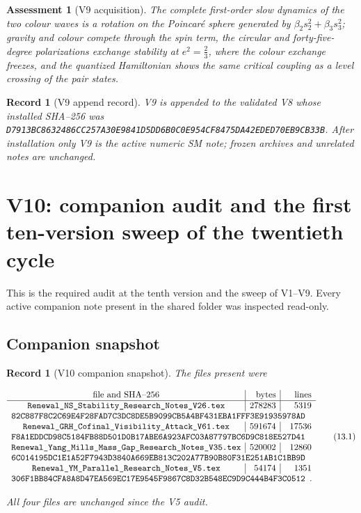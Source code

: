 \documentclass[11pt]{article}
\newtheorem{assessment}[theorem]{Assessment}
\newtheorem{record}[theorem]{Record}
\theoremstyle{remark}
\begin{document}
\begin{assessment}[V9 acquisition]
\label{ass:v20v9}
The complete first-order slow dynamics of the two colour waves is a
rotation on the Poincar\'e sphere generated by
\(\beta_2s_2^2+\beta_3s_3^2\); gravity and colour compete through the
spin term, the circular and forty-five-degree polarizations exchange
stability at \(e^2=\tfrac23\), where the colour exchange freezes, and
the quantized Hamiltonian shows the same critical coupling as a level
crossing of the pair states.
\end{assessment}

\begin{record}[V9 append record]
\label{rec:v20v9}
V9 is appended to the validated V8 whose installed SHA--256 was
\texttt{D7913BC8632486CC257A30E9841D5DD6B0C0E954CF8475DA42EDED70EB9CB33B}.
After installation only V9 is the active numeric SM note; frozen
archives and unrelated notes are unchanged.
\end{record}


\section{V10: companion audit and the first ten-version sweep of the twentieth cycle}
\label{sec:v20v10}

This is the required audit at the tenth version and the sweep of
V1--V9.  Every active companion note present in the shared folder was
inspected read-only.

\subsection{Companion snapshot}

\begin{record}[V10 companion snapshot]
\label{rec:v20v10-snapshot}
The files present were

\[
\begin{array}{c|r|r}
\hbox{file and SHA--256}&\hbox{bytes}&\hbox{lines}\\ \hline
\texttt{Renewal\_NS\_Stability\_Research\_Notes\_V26.tex}
&278283&5319\\
\multicolumn{3}{l}{
\texttt{82C887F8C2C69E4F28FAD7C3DC8DE5B9099CB5A4BF431EBA1FFF3E91935978AD}}
\\
\texttt{Renewal\_GRH\_Cofinal\_Visibility\_Attack\_V61.tex}
&591674&17536\\
\multicolumn{3}{l}{
\texttt{F8A1EDDCD98C5184FB88D501D0B17ABE6A923AFC03A87797BC6D9C818E527D41}}
\\
\texttt{Renewal\_Yang\_Mills\_Mass\_Gap\_Research\_Notes\_V35.tex}
&520002&12860\\
\multicolumn{3}{l}{
\texttt{6C014195DC1E1A52F7943D3840A669EB813C202A77B90B80F31E251AB1C1BB9D}}
\\
\texttt{Renewal\_YM\_Parallel\_Research\_Notes\_V5.tex}
&54174&1351\\
\multicolumn{3}{l}{
\texttt{306F1BB84CFA8A8D47EA569EC17E9545F9867C8D32B548EC9D9C444B4F3C0512}}.
\end{array}                                                     \tag{13.1}
\]

All four files are unchanged since the V5 audit.
\end{record}
\end{document}

